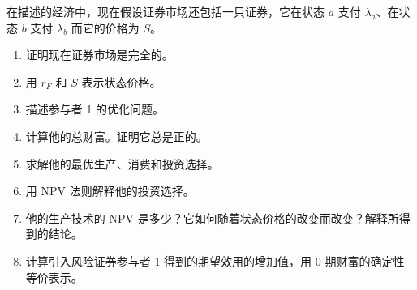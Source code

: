 \par\noindent\begin{minipage}{\linewidth}
\begin{problem}
 在描述的经济中，现在假设证券市场还包括一只证券，它在状态 $a$ 支付 $\lambda_{a}$、在状态 $b$ 支付 $\lambda_{b}$ 而它的价格为 $S$。
\begin{enumerate}[label=(\alph*)]
    \item 证明现在证券市场是完全的。
    \item 用 $r_{F}$ 和 $S$ 表示状态价格。
    \item 描述参与者 1 的优化问题。
    \item 计算他的总财富。证明它总是正的。
    \item 求解他的最优生产、消费和投资选择。
    \item 用 NPV 法则解释他的投资选择。
    \item 他的生产技术的 NPV 是多少？它如何随着状态价格的改变而改变？解释所得到的结论。
    \item 计算引入风险证券参与者 1 得到的期望效用的增加值，用 0 期财富的确定性等价表示。
\end{enumerate}
\end{problem}
\end{minipage}\par
{}
